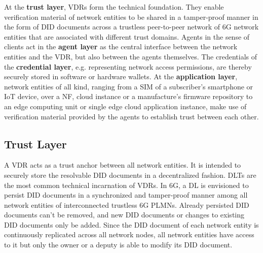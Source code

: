 \documentclass[conference]{IEEEtran}
\begin{document}
At the {\bf{trust layer}}, VDRs form the technical foundation. They enable verification material of network entities to be shared in a tamper-proof manner in the form of DID documents across a trustless peer-to-peer network of 6G network entities that are associated with different trust domains. Agents in the sense of clients act in the {\bf{agent layer}} as the central interface between the network entities and the VDR, but also between the agents themselves. The credentials of the {\bf{credential layer}}, e.g. representing network access permissions, are thereby securely stored in software or hardware wallets. At the {\bf{application layer}}, network entities of all kind, ranging from a SIM of a subscriber's smartphone or IoT device, over a NF, cloud instance or a manufacture's firmware repository to an edge computing unit or single edge cloud application instance, make use of verification material provided by the agents to establish trust between each other.

\subsection{Trust Layer}
A VDR acts as a trust anchor between all network entities. It is intended to securely store the resolvable DID documents in a decentralized fashion. DLTs are the most common technical incarnation of VDRs. In 6G, a DL is envisioned to persist DID documents in a synchronized and tamper-proof manner among all network entities of interconnected trustless 6G PLMNs. Already persisted DID documents can't be removed, and new DID documents or changes to existing DID documents only be added. Since the DID document of each network entity is continuously replicated across all network nodes, all network entities have access to it but only the owner or a deputy is able to modify its DID document. %
\end{document}
